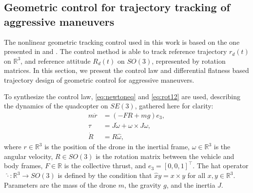 \subsection{Geometric control for trajectory tracking of aggressive maneuvers}
The nonlinear geometric tracking control used in this work is based on the one presented in \cite{lelemc2010} and \cite{turpinkumar2011}. The control method is able to track reference trajectory $r_d(t)$ on $\mathbb{R}^3$, and reference attitude $R_d(t)$ on $SO(3)$, represented by rotation matrices. In this section, we present the control law and differential flatness based trajectory design of geometric control for aggressive maneuvers.

To synthesize the control law, \eqref{eq:newtoneq} and \eqref{eq:rot12} are used, describing the dynamics of the quadcopter on $SE(3)$, gathered here for clarity:
\begin{subequations}
\begin{align}
    m\ddot{r}& = (-FR + mg)e_3,\label{eq:geom_tran}\\
    \tau& = J\dot\omega + \omega\times J \omega,\\
    \dot R &= R\hat{\omega},
\end{align}
\end{subequations}
where $r\in\mathbb{R}^3$ is the position of the drone in the inertial frame, $\omega\in\mathbb{R}^3$ is the angular velocity, $R\in SO(3)$ is the rotation matrix between the vehicle and body frames, $F\in\mathbb{R}$ is the collective thrust, and $e_3=[ 0, 0, 1 ]^\top$. The hat operator $\;\hat{\cdot}:\mathbb{R}^3\rightarrow SO(3)$ is defined by the condition that $\hat{x}y = x\times y$ for all $x,y\in \mathbb{R}^3$. Parameters are the mass of the drone $m$, the gravity $g$, and the inertia $J$.

